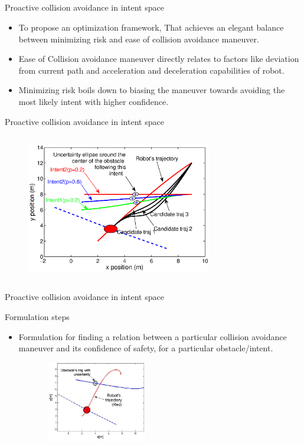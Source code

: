 \documentclass{beamer}
\begin{document}
\subsection{}
\begin{frame}{Proactive collision avoidance in intent space}
\begin{itemize}
\item{To propose an optimization framework,
That achieves an elegant balance between minimizing risk and ease of collision avoidance maneuver.}
\item{Ease of Collision avoidance maneuver directly relates to factors like deviation from current path and acceleration and deceleration capabilities of robot.}
\item{Minimizing risk boils down to biasing the maneuver towards avoiding the most likely intent with higher confidence.}
\end{itemize}
\end{frame}
\begin{frame}{Proactive collision avoidance in intent space}
\begin{figure}
\centering
\includegraphics[width= 8.1cm, height=6.5cm]{full_plot.eps}
\end{figure}
\end{frame}
\begin{frame}{Proactive collision avoidance in intent space}
\begin{block}{Formulation steps}
\begin{itemize}
\item{Formulation for finding a relation between a particular collision avoidance maneuver and its confidence of safety, for a particular obstacle/intent.}
\end{itemize}
\begin{figure}
\centering
\includegraphics[width= 6.1cm, height=3.5cm]{fig1.eps}
\end{figure}
\end{block}
\end{frame}
\end{document}
